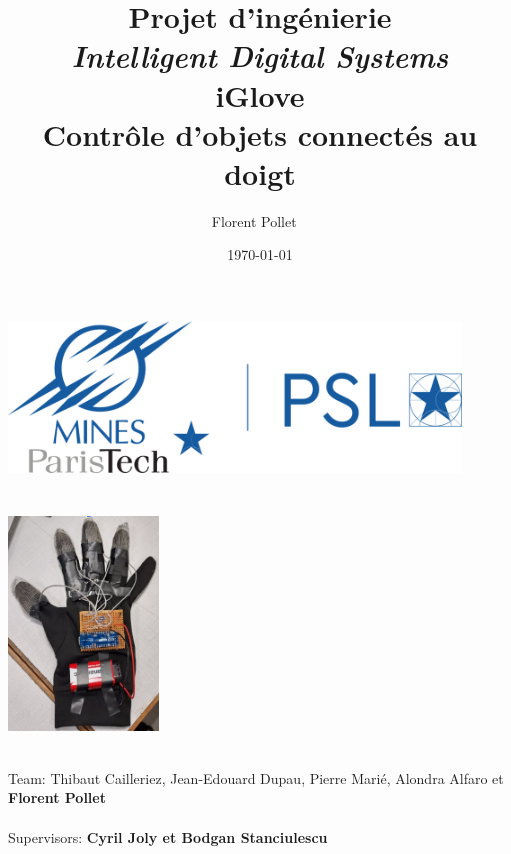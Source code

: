 \title{\Large Projet d'ingénierie\\
        \emph{Intelligent Digital Systems} \\
        \bf\Large iGlove \\
        Contrôle d’objets connectés au doigt}
\author{\large Florent Pollet \ \\}
\date{\large\today}

\makeatletter
    \begin{titlepage}
        \begin{center}
	   { \includegraphics[width=12cm]{imgs/mp_logo.png}}
	   {\ \\ \ \\}
        \vbox{}\vspace{1cm}
            {\@title }\\[0.5cm] 

            {
                \includegraphics[width=0.3\textwidth]{imgs/Gant.png}
            }

            {\large \ \\ Team: Thibaut Cailleriez, Jean-Edouard Dupau, Pierre Marié, Alondra Alfaro et \bf Florent Pollet\ \\}
            {\large \ \\ Supervisors: \bf Cyril Joly et Bodgan Stanciulescu\ \\}
            \vspace{1cm}
            {\@date\\}


\end{center}
\end{titlepage}
